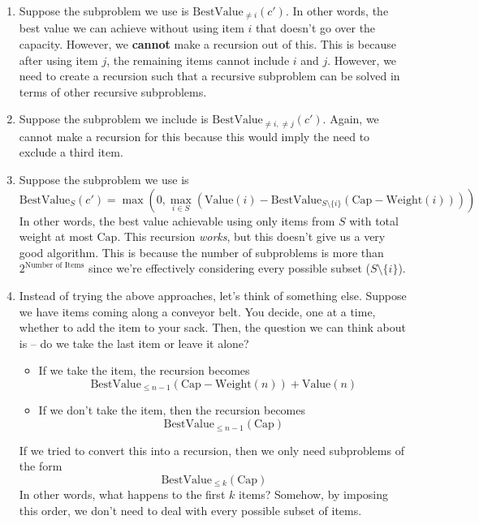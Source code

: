 \documentclass[letterpaper]{article}
\begin{document}
\begin{enumerate}
    \item Suppose the subproblem we use is $\text{BestValue}_{\neq i}(c')$. In other words, the best value we can achieve without using item $i$ that doesn't go over the capacity. However, we \textbf{cannot} make a recursion out of this. This is because after using item $j$, the remaining items cannot include $i$ and $j$. However, we need to create a recursion such that a recursive subproblem can be solved in terms of other recursive subproblems.
    
    \item Suppose the subproblem we include is $\text{BestValue}_{\neq i, \neq j}(c')$. Again, we cannot make a recursion for this because this would imply the need to exclude a third item. 
    
    \item Suppose the subproblem we use is
    \[\text{BestValue}_{S}(c') = \max\left(0, \max_{i \in S}(\text{Value}(i) - \text{BestValue}_{S \setminus \{i\}}(\text{Cap} - \text{Weight}(i)))\right)\]
    In other words, the best value achievable using only items from $S$ with total weight at most $\text{Cap}$. This recursion \emph{works}, but this doesn't give us a very good algorithm. This is because the number of subproblems is more than $2^{\text{Number of Items}}$ since we're effectively considering every possible subset ($S \setminus \{i\}$). 
    
    \item Instead of trying the above approaches, let's think of something else. Suppose we have items coming along a conveyor belt. You decide, one at a time, whether to add the item to your sack. Then, the question we can think about is -- do we take the last item or leave it alone? 
    \begin{itemize}
        \item If we take the item, the recursion becomes
        \[\text{BestValue}_{\leq n - 1}(\text{Cap} - \text{Weight}(n)) + \text{Value}(n)\]
        \item If we don't take the item, then the recursion becomes 
        \[\text{BestValue}_{\leq n - 1}(\text{Cap})\]
    \end{itemize}
    If we tried to convert this into a recursion, then we only need subproblems of the form 
    \[\text{BestValue}_{\leq k}(\text{Cap})\]
    In other words, what happens to the first $k$ items? Somehow, by imposing this order, we don't need to deal with every possible subset of items.
\end{enumerate}
\end{document}
